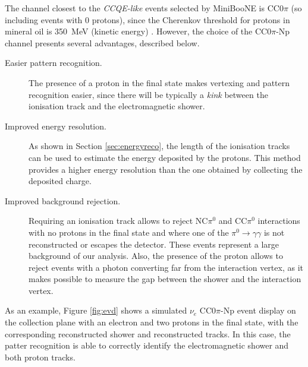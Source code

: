 The channel closest to the \emph{CCQE-like} events selected by MiniBooNE is CC0$\pi$ (so including events with 0 protons), since the Cherenkov threshold for protons in mineral oil is 350~MeV (kinetic energy) \cite{Perevalov:2009mn}.
However, the choice of the CC0$\pi$-Np channel presents several advantages, described below.
\begin{description}
    \item[Easier pattern recognition.] The presence of a proton in the final state makes vertexing and pattern recognition easier, since there will be typically a \emph{kink} between the ionisation track and the electromagnetic shower.
    \item[Improved energy resolution.] As shown in Section \ref{sec:energyreco}, the length of the ionisation tracks can be used to estimate the energy deposited by the protons. This method provides a higher energy resolution than the one obtained by collecting the deposited charge.
    \item[Improved background rejection.] Requiring an ionisation track allows to reject NC$\pi^0$ and CC$\pi^0$ interactions with no protons in the final state and where one of the $\pi^0\rightarrow\gamma\gamma$ is not reconstructed or escapes the detector. These events represent a large background of our analysis. Also, the presence of the proton allows to reject events with a photon converting far from the interaction vertex, as it makes possible to measure the gap between the shower and the interaction vertex.
\end{description}


As an example, Figure \ref{fig:evd} shows a simulated $\nu_{e}$ CC0$\pi$-Np event display on the collection plane with an electron and two protons in the final state, with the corresponding reconstructed shower and reconstructed tracks. In this case, the patter recognition is able to correctly identify the electromagnetic shower and both proton tracks.

